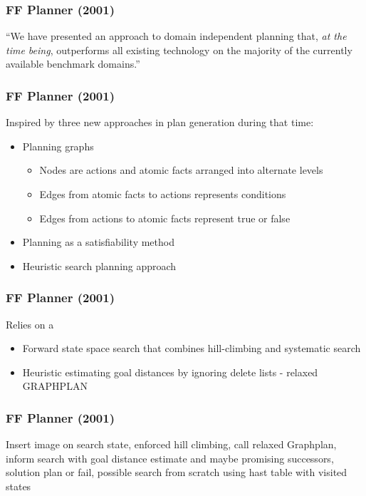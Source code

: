 \documentclass{beamer}
\let\origframetitle=\frametitle
\renewcommand\frametitle[1]{\origframetitle{\textbf{\large{\textrm{#1}}}}}
\begin{document}
\begin{frame}
  \frametitle{FF Planner (2001)}

  ``We have presented an approach to domain independent planning that, \emph{at
  the time being}, outperforms all existing technology on the majority of the
  currently available benchmark domains.''

\end{frame}

\begin{frame}
  \frametitle{FF Planner (2001)}

  Inspired by three new approaches in plan generation during that time:

  \begin{itemize}
    \item Planning graphs
    \begin{itemize}
      \item Nodes are actions and atomic facts arranged into alternate levels
      \item Edges from atomic facts to actions represents conditions
      \item Edges from actions to atomic facts represent true or false
    \end{itemize}
    \item Planning as a satisfiability method
    \item Heuristic search planning approach
  \end{itemize}
\end{frame}

\begin{frame}
  \frametitle{FF Planner (2001)}

  Relies on a

  \begin{itemize}
    \item Forward state space search that combines hill-climbing and systematic search
    \item Heuristic estimating goal distances by ignoring delete lists - relaxed GRAPHPLAN
  \end{itemize}

\end{frame}

\begin{frame}
  \frametitle{FF Planner (2001)}

  Insert image on search state, enforced hill climbing, call relaxed Graphplan,
  inform search with goal distance estimate and maybe promising successors,
  solution plan or fail, possible search from scratch using hast table with
  visited states

\end{frame}
\end{document}
